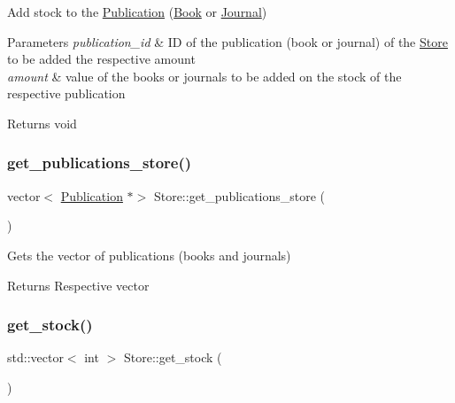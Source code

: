 Add stock to the \hyperlink{class_publication}{Publication} (\hyperlink{class_book}{Book} or \hyperlink{class_journal}{Journal}) 


\begin{DoxyParams}{Parameters}
{\em publication\+\_\+id} & ID of the publication (book or journal) of the \hyperlink{class_store}{Store} to be added the respective amount \\
\hline
{\em amount} & value of the books or journals to be added on the stock of the respective publication\\
\hline
\end{DoxyParams}
\begin{DoxyReturn}{Returns}
void 
\end{DoxyReturn}
\mbox{\label{class_store_a05e802d26ede5fc4225074d1c732b3f3}} 
\subsubsection{\texorpdfstring{get\+\_\+publications\+\_\+store()}{get\_publications\_store()}}
{\footnotesize\ttfamily vector$<$ \hyperlink{class_publication}{Publication} $\ast$$>$ Store\+::get\+\_\+publications\+\_\+store (\begin{DoxyParamCaption}{ }\end{DoxyParamCaption})}



Gets the vector of publications (books and journals) 

\begin{DoxyReturn}{Returns}
Respective vector 
\end{DoxyReturn}
\mbox{\label{class_store_aafbf7d4dae475fca1d27fa1b212936c4}} 
\subsubsection{\texorpdfstring{get\+\_\+stock()}{get\_stock()}}
{\footnotesize\ttfamily std\+::vector$<$ int $>$ Store\+::get\+\_\+stock (\begin{DoxyParamCaption}{ }\end{DoxyParamCaption})}



